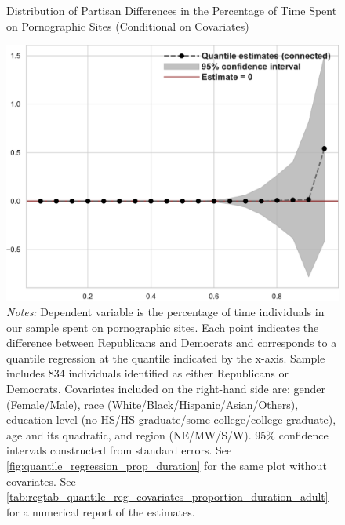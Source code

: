 \documentclass[12pt, letterpaper]{article}
\begin{document}
\begin{figure}[ht]
	\centering
	\caption{Distribution of Partisan Differences in the Percentage of Time Spent on Pornographic Sites (Conditional on Covariates)}
	\includegraphics[width=.55\linewidth]{../figs/quantile_reg_covariates_proportion_duration_adult.pdf}
	\caption*{\footnotesize \emph{Notes:} 
		Dependent variable is the percentage of time individuals in our sample spent on pornographic sites.
		Each point indicates the difference between Republicans and Democrats and corresponds to a quantile regression at the quantile indicated by the x-axis.
		Sample includes 834 individuals identified as either Republicans or Democrats.
		Covariates included on the right-hand side are: gender (Female/Male), race (White/Black/Hispanic/Asian/Others), education level (no HS/HS graduate/some college/college graduate), age and its quadratic, and region (NE/MW/S/W).
		95\% confidence intervals constructed from standard errors.
		See \cref{fig:quantile_regression_prop_duration} for the same plot without covariates.
		See \cref{tab:regtab_quantile_reg_covariates_proportion_duration_adult} for a numerical report of the estimates.
	}
	\label{fig:quantile_regression_prop_duration_covariates}
\end{figure}
\end{document}
